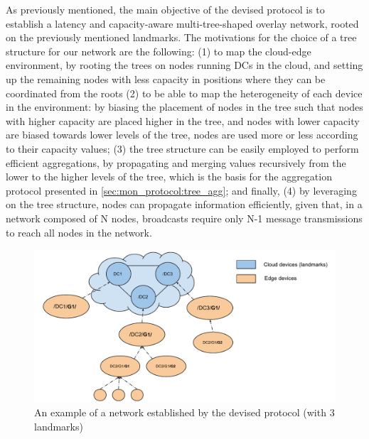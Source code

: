 As previously mentioned, the main objective of the devised protocol is to establish a latency and capacity-aware multi-tree-shaped overlay network, rooted on the previously mentioned landmarks. The motivations for the choice of a tree structure for our network are the following: (1) to map the cloud-edge environment, by rooting the trees on nodes running DCs in the cloud, and setting up the remaining nodes with less capacity in positions where they can be coordinated from the roots (2) to be able to map the heterogeneity of each device in the environment: by biasing the placement of nodes in the tree such that nodes with higher capacity are placed higher in the tree, and nodes with lower capacity are biased towards lower levels of the tree, nodes are used more or less according to their capacity values; (3) the tree structure can be easily employed to perform efficient aggregations, by propagating and merging values recursively from the lower to the higher levels of the tree, which is the basis for the aggregation protocol presented in \ref{sec:mon_protocol:tree_agg}; and finally, (4) by leveraging on the tree structure, nodes can propagate information efficiently, given that, in a network composed of N nodes, broadcasts require only N-1 message transmissions to reach all nodes in the network. 

\begin{figure}[htbp]
    \centering
    \includegraphics[width=\textwidth]{Chapters/membership/images/DeMMon-overlay-structure.pdf}
    \caption{An example of a network established by the devised protocol (with 3 landmarks)}
    \label{fig:demmon-membership-structure}
\end{figure}

